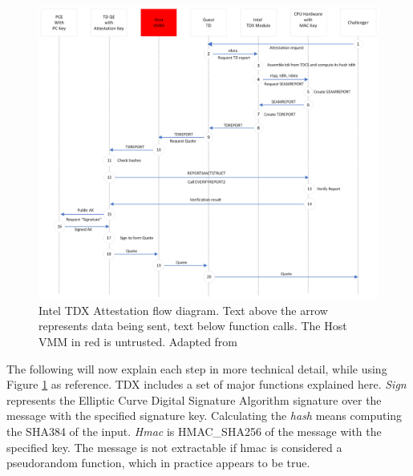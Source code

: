 \begin{figure}
\centering
\includegraphics[width=\textwidth]{figures/Attestation Diagram (1).png}
\caption{Intel TDX Attestation flow diagram. Text above the arrow represents data being sent, text below function calls. The Host VMM in red is untrusted. Adapted from \cite{sardar_demystifying_2021}}
\label{fig:QuoteGeneration}
\end{figure}
The following will now explain each step in more technical detail, while using Figure \ref{fig:QuoteGeneration} as reference. 
TDX includes a set of major functions explained here. \textit{Sign} represents the Elliptic Curve Digital Signature Algorithm signature over the message with the specified signature key. 
Calculating the \textit{hash} means computing the SHA384 of the input. \textit{Hmac} is HMAC\_SHA256 of the message with the specified key. The message is not extractable if hmac is considered a pseudorandom function, which in practice appears to be true\cite{bellare_new_2006}.
\newcommand\setItemnumber[1]{\setcounter{enumi}{\numexpr#1-1\relax}}
